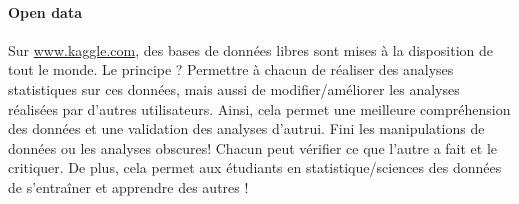 \documentclass[10pt]{../fiche}
\begin{document}

\paragraph{Open data} Sur \url{www.kaggle.com}, des bases de données libres sont mises à la disposition de tout le monde. Le principe ? Permettre à chacun de réaliser des analyses statistiques sur ces données, mais aussi de modifier/améliorer les analyses réalisées par d'autres utilisateurs. Ainsi, cela permet une meilleure compréhension des données et une validation des analyses d'autrui. Fini les manipulations de données ou les analyses obscures! Chacun peut vérifier ce que l'autre a fait et le critiquer. De plus, cela permet aux étudiants en statistique/sciences des données de s'entraîner et apprendre des autres !
\end{document}
